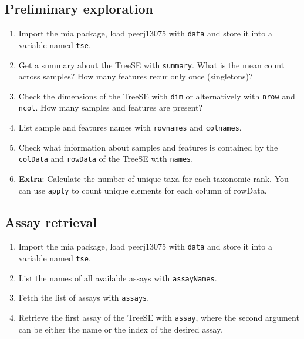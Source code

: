 \documentclass[
]{book}
\providecommand{\tightlist}{%
  \setlength{\itemsep}{0pt}\setlength{\parskip}{0pt}}
\begin{document}
\hypertarget{preliminary-exploration}{%
\subsection{Preliminary exploration}\label{preliminary-exploration}}

\begin{enumerate}
\def\labelenumi{\arabic{enumi}.}
\tightlist
\item
  Import the mia package, load peerj13075 with \texttt{data} and store it into a
  variable named \texttt{tse}.
\item
  Get a summary about the TreeSE with \texttt{summary}. What is the mean count across
  samples? How many features recur only once (singletons)?
\item
  Check the dimensions of the TreeSE with \texttt{dim} or alternatively with \texttt{nrow}
  and \texttt{ncol}. How many samples and features are present?
\item
  List sample and features names with \texttt{rownames} and \texttt{colnames}.
\item
  Check what information about samples and features is contained by the
  \texttt{colData} and \texttt{rowData} of the TreeSE with \texttt{names}.
\item
  \textbf{Extra}: Calculate the number of unique taxa for each taxonomic rank. You
  can use \texttt{apply} to count unique elements for each column of rowData.
\end{enumerate}

\hypertarget{assay-retrieval}{%
\subsection{Assay retrieval}\label{assay-retrieval}}

\begin{enumerate}
\def\labelenumi{\arabic{enumi}.}
\tightlist
\item
  Import the mia package, load peerj13075 with \texttt{data} and store it into a
  variable named \texttt{tse}.
\item
  List the names of all available assays with \texttt{assayNames}.
\item
  Fetch the list of assays with \texttt{assays}.
\item
  Retrieve the first assay of the TreeSE with \texttt{assay}, where the second
  argument can be either the name or the index of the desired assay.
\end{enumerate}
\end{document}

